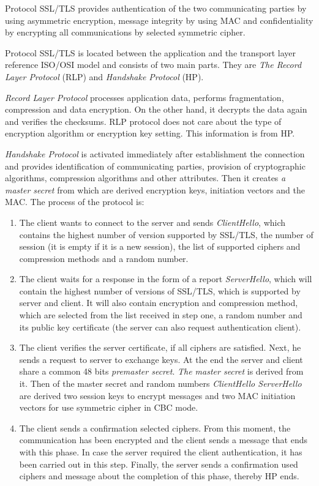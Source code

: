 \documentclass[
  digital, %
  notable,   %
  lof,     %
  lot,     %
]{fithesis3}
\begin{document}
Protocol SSL/TLS provides authentication of the two communicating parties by using asymmetric 
encryption, message integrity by using MAC and confidentiality by encrypting all 
communications by selected symmetric cipher.

Protocol SSL/TLS is located between the application and the transport layer reference ISO/OSI 
model and consists of two main parts. They are \textit{The Record Layer Protocol} (RLP) and 
\textit{Handshake Protocol} (HP). %

\textit{Record Layer Protocol} processes application data, performs fragmentation, compression 
and data encryption. On the other hand, it decrypts the data again and verifies the checksums. 
RLP protocol does not care about the type of encryption algorithm or encryption key setting. 
This information is from HP.

\textit{Handshake Protocol} is activated immediately after establishment the connection and 
provides identification of communicating parties, provision of cryptographic algorithms, 
compression algorithms and other attributes. Then it creates \textit{a master secret} from 
which are derived encryption keys, initiation vectors and the MAC. The process of the protocol 
is:
\vskip0.1in
\begin{enumerate}
\item The client wants to connect to the server and sends \textit{ClientHello}, which contains 
the highest number of version supported by SSL/TLS, the number of session (it is empty if it 
is a new session), the list of supported ciphers and compression methods and a random number.
\item The client waits for a response in the form of a report \textit{ServerHello}, which will 
contain the highest number of versions of SSL/TLS, which is supported by server and client. It 
will also contain encryption and compression method, which are selected from the list received 
in step one, a random number and its public key certificate (the server can also request 
authentication client).
\item The client verifies the server certificate, if all ciphers are satisfied. Next, he sends 
a request to server to exchange keys. At the end the server and client share a common 48 bits 
\textit{premaster secret}. \textit{The master secret} is derived from it. Then of the master 
secret and random numbers \textit{ClientHello ServerHello} are derived two session keys to 
encrypt messages and two MAC initiation vectors for use symmetric cipher in CBC mode. 
\item The client sends a confirmation selected ciphers. From this moment, the communication 
has been encrypted and the client sends a message that ends with this phase. In case the 
server required the client authentication, it has been carried out in this step. Finally, the 
server sends a confirmation used ciphers and message about the completion of this phase, 
thereby HP ends.
\end{enumerate}
\end{document}
